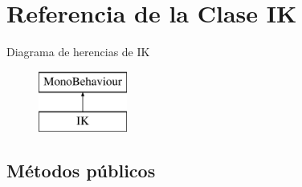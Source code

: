 \hypertarget{class_i_k}{}\section{Referencia de la Clase IK}
\label{class_i_k}
Diagrama de herencias de IK\begin{figure}[H]
\begin{center}
\leavevmode
\includegraphics[height=2.000000cm]{class_i_k}
\end{center}
\end{figure}
\subsection*{Métodos públicos}
